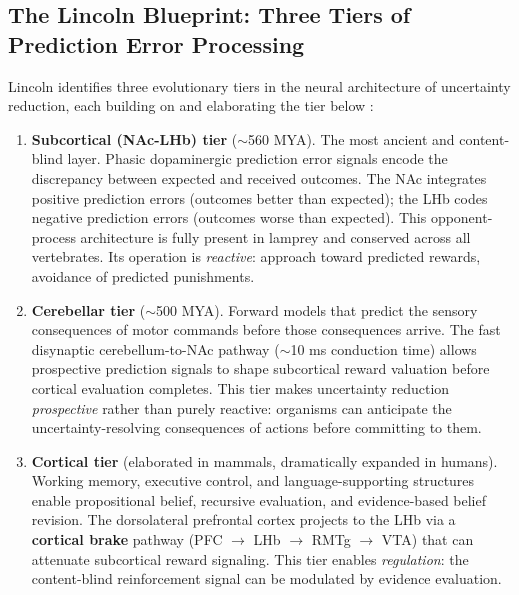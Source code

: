 \documentclass[11pt,a4paper]{article}
\theoremstyle{remark}
\begin{document}
\subsection{The Lincoln Blueprint: Three Tiers of Prediction Error Processing}
\label{sec:lincoln-blueprint}

Lincoln identifies three evolutionary tiers in the neural architecture of
uncertainty reduction, each building on and elaborating the tier below
\cite{lincoln2026}:

\begin{enumerate}[leftmargin=*,nosep]
  \item \textbf{Subcortical (NAc-LHb) tier} ($\sim$560 MYA). The most ancient
    and content-blind layer. Phasic dopaminergic prediction error signals encode
    the discrepancy between expected and received outcomes. The NAc integrates
    positive prediction errors (outcomes better than expected); the LHb codes
    negative prediction errors (outcomes worse than expected). This opponent-process
    architecture is fully present in lamprey and conserved across all vertebrates.
    Its operation is \textit{reactive}: approach toward predicted rewards,
    avoidance of predicted punishments.
  \item \textbf{Cerebellar tier} ($\sim$500 MYA). Forward models that predict
    the sensory consequences of motor commands before those consequences arrive.
    The fast disynaptic cerebellum-to-NAc pathway ($\sim$10 ms conduction time)
    allows prospective prediction signals to shape subcortical reward valuation
    before cortical evaluation completes. This tier makes uncertainty reduction
    \textit{prospective} rather than purely reactive: organisms can anticipate
    the uncertainty-resolving consequences of actions before committing to them.
  \item \textbf{Cortical tier} (elaborated in mammals, dramatically expanded in
    humans). Working memory, executive control, and language-supporting structures
    enable propositional belief, recursive evaluation, and evidence-based belief
    revision. The dorsolateral prefrontal cortex projects to the LHb via a
    \textbf{cortical brake} pathway (PFC $\to$ LHb $\to$ RMTg $\to$ VTA) that
    can attenuate subcortical reward signaling. This tier enables
    \textit{regulation}: the content-blind reinforcement signal can be
    modulated by evidence evaluation.
\end{enumerate}
\end{document}

